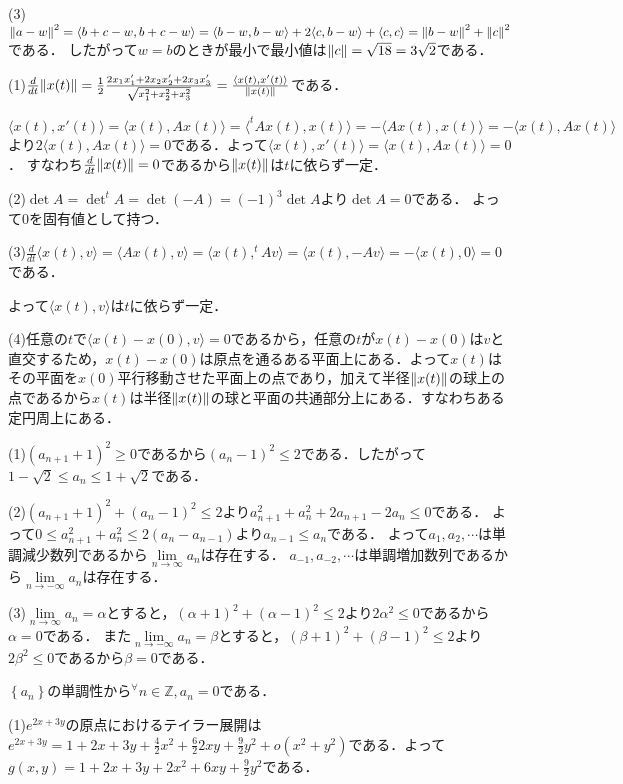 \documentclass[
		book,
		head_space=20mm,
		foot_space=20mm,
		gutter=10mm,
		line_length=190mm
]{jlreq}
\begin{document}
(3)$\norm{a-w}^2=\langle b+c-w,b+c-w\rangle=\langle b-w,b-w\rangle+2\langle c,b-w\rangle+\langle c,c\rangle=\norm{b-w}^2+\norm{c}^2$である．
したがって$w=b$のときが最小で最小値は$\norm{c}=\sqrt{18}=3\sqrt{2}$である．

(1)$\frac{d}{dt}\norm{x(t)}=\frac{1}{2}\frac{2x_1x_1'+2x_2x_2'+2x_3x_3'}{\sqrt{x_1^2+x_2^2+x_3^2}}=\frac{\langle x(t),x'(t)\rangle}{\norm{x(t)}}$である．

$\langle x(t),x'(t)\rangle=\langle x(t),Ax(t)\rangle=\langle ^t\!A x(t),x(t)\rangle=-\langle Ax(t),x(t)\rangle=-\langle x(t),Ax(t)\rangle$より$2\langle x(t),Ax(t)\rangle=0$である．よって$\langle x(t),x'(t)\rangle=\langle x(t),Ax(t)\rangle=0$．
すなわち$\frac{d}{dt}\norm{x(t)}=0$であるから$\norm{x(t)}$は$t$に依らず一定．

(2)$\det A=\det ^t\!A=\det (-A)=(-1)^3\det A$より$\det A=0$である．
よって$0$を固有値として持つ．

(3)$\frac{d}{dt}\langle x(t),v\rangle=\langle Ax(t),v\rangle=\langle x(t),^t\!A v\rangle=\langle x(t),-A v\rangle=-\langle x(t),0\rangle=0$である．

よって$\langle x(t),v\rangle$は$t$に依らず一定．

(4)任意の$t$で$\langle x(t)-x(0),v\rangle=0$であるから，任意の$t$が$x(t)-x(0)$は$v$と直交するため，$x(t)-x(0)$は原点を通るある平面上にある．よって$x(t)$はその平面を$x(0)$平行移動させた平面上の点であり，加えて半径$\norm{x(t)}$の球上の点であるから$x(t)$は半径$\norm{x(t)}$の球と平面の共通部分上にある．すなわちある定円周上にある．

(1)$(a_{n+1}+1)^2\ge 0$であるから$(a_n-1)^2\le2$である．したがって$1-\sqrt{2}\le a_n\le 1+\sqrt{2}$である．

(2)$(a_{n+1}+1)^2+(a_n-1)^2\le 2$より$a_{n+1}^2+a_n^2+2a_{n+1}-2a_n\le 0$である．
よって$0\le a_{n+1}^2+a_n^2\le 2(a_n-a_{n-1})$より$a_{n-1}\le a_n$である．
よって$a_1,a_2,\cdots$は単調減少数列であるから$\lim\limits_{n\to \infty}a_n$は存在する．
$a_{-1},a_{-2},\cdots$は単調増加数列であるから$\lim\limits_{n\to -\infty}a_n$は存在する．

(3)$\lim\limits_{n\to \infty}a_n=\alpha$とすると，$(\alpha+1)^2+(\alpha-1)^2\le 2$より$2\alpha^2\le 0$であるから$\alpha=0$である．
また$\lim\limits_{n\to -\infty}a_n=\beta$とすると，$(\beta+1)^2+(\beta-1)^2\le 2$より$2\beta^2\le 0$であるから$\beta=0$である．

$\left\{ a_n \right\}$の単調性から$^\forall n\in \mathbb{Z},a_n=0$である．

(1)$e^{2x+3y}$の原点におけるテイラー展開は$e^{2x+3y}=1+2x+3y+\frac{4}{2}x^2+\frac{6}{2}2xy+\frac{9}{2}y^2+o(x^2+y^2)$である．よって$g(x,y)=1+2x+3y+2x^2+6xy+\frac{9}{2}y^2$である．
\end{document}

